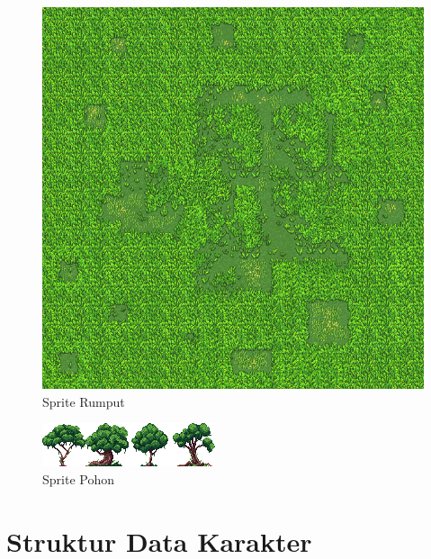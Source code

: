 \documentclass[oneside, a4paper ,12pt]{book}
\begin{document}
	\begin{figure} [h]
		\centering
		\includegraphics[width=10 cm]{grass.png}
		\caption{Sprite Rumput}
	\end{figure}
	\begin{figure}
		\centering
		\includegraphics[width=10 cm]{48x48_trees.png}
		\caption{Sprite Pohon}
	\end{figure}
	
	
	\chapter{Struktur Data Karakter}
	
\end{document}
